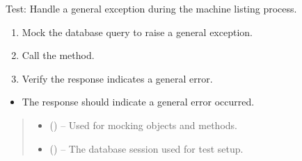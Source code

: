 \documentclass[letterpaper,10pt,english]{sphinxmanual}
\begin{document}

\begin{fulllineitems}
\label{\detokenize{test:test.test_machine.test_list_machines_general_exception}}
\pysigstartsignatures
\pysiglinewithargsret
{}
{\sphinxparamcomma {}}
{}
\pysigstopsignatures
\sphinxAtStartPar
Test: Handle a general exception during the machine listing process.
\begin{description}
\begin{enumerate}
%
\item {} 
\sphinxAtStartPar
Mock the database query to raise a general exception.

\item {} 
\sphinxAtStartPar
Call the  method.

\item {} 
\sphinxAtStartPar
Verify the response indicates a general error.

\end{enumerate}

\begin{itemize}
\item {} 
\sphinxAtStartPar
The response should indicate a general error occurred.

\end{itemize}

\end{description}
\begin{quote}\begin{description}
\begin{itemize}
\item {} 
\sphinxAtStartPar
{} () – Used for mocking objects and methods.

\item {} 
\sphinxAtStartPar
{} () – The database session used for test setup.

\end{itemize}

\end{description}\end{quote}

\end{fulllineitems}
\end{document}
